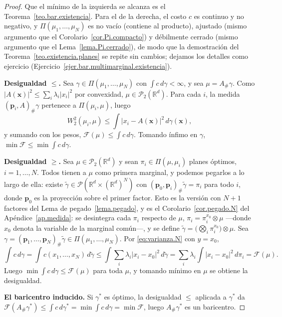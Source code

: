 \documentclass[12pt, a4paper]{amsbook}
\newcommand{\R}{{\mathbb R}}
\newcommand{\pp}{{\mathbf p}}
\theoremstyle{remark}
\theoremstyle{definition}
\numberwithin{section}{chapter}
\numberwithin{subsection}{section}
\numberwithin{equation}{section}
\numberwithin{figure}{chapter}
\begin{document}
\begin{proof}
Que el mínimo de la izquierda se alcanza es el
Teorema~\ref{teo.bar.existencia}. Para el de la derecha, el costo $c$ es
continuo y no negativo, y $\Pi(\mu_1,\dots,\mu_N)$ es no vacío (contiene al
producto), ajustado (mismo argumento que el Corolario~\ref{cor.Pi.compacto})
y débilmente cerrado (mismo argumento que el Lema~\ref{lema.Pi.cerrado}), de
modo que la demostración del Teorema~\ref{teo.existencia.planes} se repite sin
cambios; dejamos los detalles como ejercicio
(Ejercicio~\ref{ejer.bar.multimarginal.existencia}).

\medskip
\textbf{Desigualdad $\le$.} Sea $\gamma\in\Pi(\mu_1,\dots,\mu_N)$ con
$\int c\,d\gamma<\infty$, y sea $\mu=A_\#\gamma$. Como $|A(\mathbf x)|^2\le\sum_i\lambda_i|x_i|^2$
por convexidad, $\mu\in\mathcal P_2(\R^d)$. Para cada $i$, la medida
$(\pp_i,A)_\#\gamma$ pertenece a $\Pi(\mu_i,\mu)$, luego
\[
W_2^2(\mu_i,\mu)\le\int|x_i-A(\mathbf x)|^2\,d\gamma(\mathbf x),
\]
y sumando con los pesos, $\mathcal F(\mu)\le\int c\,d\gamma$. Tomando ínfimo
en $\gamma$, $\min\mathcal F\le\min\int c\,d\gamma$.

\medskip
\textbf{Desigualdad $\ge$.} Sea $\mu\in\mathcal P_2(\R^d)$ y sean
$\pi_i\in\Pi(\mu,\mu_i)$ planes óptimos, $i=1,\dots,N$. Todos tienen a $\mu$
como primera marginal, y podemos pegarlos a lo largo de ella: existe
$\widetilde\gamma\in\mathcal P(\R^d\times(\R^d)^N)$ con
$(\pp_0,\pp_i)_\#\widetilde\gamma=\pi_i$ para todo $i$, donde $\pp_0$ es la
proyección sobre el primer factor. Esto es la versión con $N+1$ factores del
Lema de pegado~\ref{lema.pegado}, y es el
Corolario~\ref{cor.pegado.N} del Apéndice~\ref{ap.medida}: se desintegra
cada $\pi_i$ respecto de $\mu$, $\pi_i=\pi_i^{x_0}\otimes\mu$ —donde $x_0$
denota la variable de la marginal común—, y se define
$\widetilde\gamma=\bigl(\bigotimes_i\pi_i^{x_0}\bigr)\otimes\mu$. Sea
$\gamma=(\pp_1,\dots,\pp_N)_\#\widetilde\gamma\in\Pi(\mu_1,\dots,\mu_N)$.
Por \eqref{eq:varianza.N} con $y=x_0$,
\[
\int c\,d\gamma
=\int c(x_1,\dots,x_N)\,d\widetilde\gamma
\le\int\sum_i\lambda_i|x_i-x_0|^2\,d\widetilde\gamma
=\sum_i\lambda_i\int|x_i-x_0|^2\,d\pi_i
=\mathcal F(\mu).
\]
Luego $\min\int c\,d\gamma\le\mathcal F(\mu)$ para toda $\mu$, y tomando
mínimo en $\mu$ se obtiene la desigualdad.

\medskip
\textbf{El baricentro inducido.} Si $\gamma^*$ es óptimo, la desigualdad
$\le$ aplicada a $\gamma^*$ da
$\mathcal F(A_\#\gamma^*)\le\int c\,d\gamma^*=\min\int c\,d\gamma=\min\mathcal F$,
luego $A_\#\gamma^*$ es un baricentro.
\end{proof}
\end{document}
